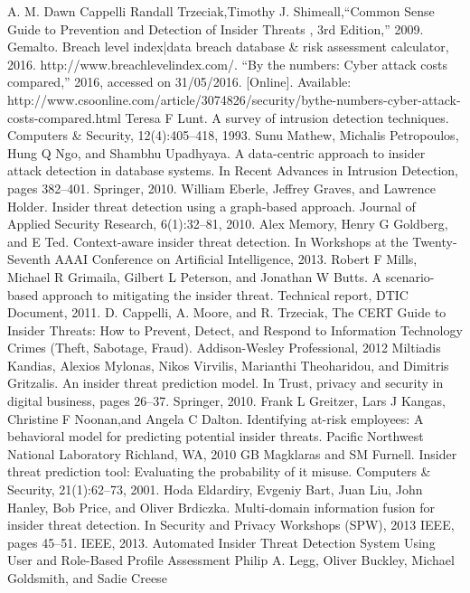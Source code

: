 \documentclass[conference]{IEEEtran}
\begin{document}
\begin{thebibliography}{00}
\iffalse
{}A. M. Dawn Cappelli Randall Trzeciak,Timothy J. Shimeall,“Common Sense Guide to Prevention and Detection of Insider
Threats , 3rd Edition,” 2009.
 Gemalto. Breach level index|data breach database \& risk assessment calculator, 2016. http://www.breachlevelindex.com/.
 “By the numbers: Cyber attack costs compared,” 2016, accessed on 31/05/2016. [Online]. Available: http://www.csoonline.com/article/3074826/security/bythe-numbers-cyber-attack-costs-compared.html
 Teresa F Lunt. A survey of intrusion detection techniques. Computers \& Security, 12(4):405–418, 1993.
 Sunu Mathew, Michalis Petropoulos, Hung Q Ngo, and Shambhu Upadhyaya. A data-centric approach to insider attack detection in database systems. In Recent Advances in Intrusion Detection, pages 382–401. Springer, 2010.
 William Eberle, Jeffrey Graves, and Lawrence Holder. Insider threat detection using a graph-based approach. Journal of Applied Security Research, 6(1):32–81, 2010.
 Alex Memory, Henry G Goldberg, and E Ted. Context-aware insider threat detection. In Workshops at the Twenty-Seventh AAAI Conference on Artificial
Intelligence, 2013.
 Robert F Mills, Michael R Grimaila, Gilbert L Peterson, and Jonathan W Butts. A scenario-based approach to mitigating the insider threat. Technical report, DTIC Document, 2011.
  D. Cappelli, A. Moore, and R. Trzeciak, The CERT Guide to Insider Threats: How to Prevent, Detect, and Respond
to Information Technology Crimes (Theft, Sabotage, Fraud). Addison-Wesley Professional, 2012
  Miltiadis Kandias, Alexios Mylonas, Nikos Virvilis, Marianthi Theoharidou, and Dimitris Gritzalis. An insider threat prediction model. In Trust, privacy and security in digital business, pages 26–37. Springer, 2010.
Frank L Greitzer, Lars J Kangas, Christine F Noonan,and Angela C Dalton. Identifying at-risk employees: A behavioral model for predicting potential insider threats. Pacific Northwest National Laboratory Richland, WA, 2010
GB Magklaras and SM Furnell. Insider threat prediction tool: Evaluating the probability of it misuse. Computers \& Security, 21(1):62–73, 2001.
Hoda Eldardiry, Evgeniy Bart, Juan Liu, John Hanley, Bob Price, and Oliver Brdiczka. Multi-domain information fusion for insider threat detection. In Security and Privacy Workshops (SPW), 2013 IEEE, pages 45–51. IEEE, 2013.
Automated Insider Threat Detection System Using User and Role-Based Profile Assessment Philip A. Legg, Oliver Buckley, Michael Goldsmith, and Sadie Creese

\end{thebibliography}
\end{document}
